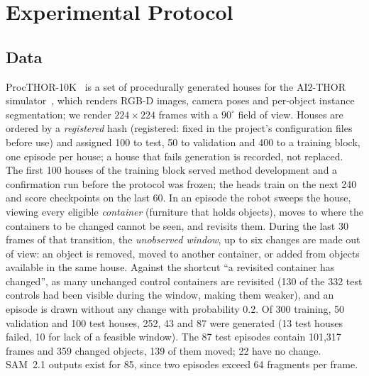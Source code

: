 \section{Experimental Protocol}
\label{sec:protocol}

\subsection{Data}
\label{sec:data}
ProcTHOR-10K~\cite{procthor2022} is a set of procedurally generated houses for the AI2-THOR simulator~\cite{ai2thor2017}, which renders RGB-D images, camera poses and per-object instance segmentation; we render $224\times224$ frames with a $90^\circ$ field of view.
Houses are ordered by a \emph{registered} hash (registered: fixed in the project's configuration files before use) and assigned 100 to test, 50 to validation and 400 to a training block, one episode per house; a house that fails generation is recorded, not replaced.
The first 100 houses of the training block served method development and a confirmation run before the protocol was frozen; the heads train on the next 240 and score checkpoints on the last 60.
In an episode the robot sweeps the house, viewing every eligible \emph{container} (furniture that holds objects), moves to where the containers to be changed cannot be seen, and revisits them.
During the last 30 frames of that transition, the \emph{unobserved window}, up to six changes are made out of view: an object is removed, moved to another container, or added from objects available in the same house.
Against the shortcut ``a revisited container has changed'', as many unchanged control containers are revisited (130 of the 332 test controls had been visible during the window, making them weaker), and an episode is drawn without any change with probability 0.2.
Of 300 training, 50 validation and 100 test houses, 252, 43 and 87 were generated (13 test houses failed, 10 for lack of a feasible window).
The 87 test episodes contain 101,317 frames and 359 changed objects, 139 of them moved; 22 have no change. SAM~2.1 outputs exist for 85, since two episodes exceed 64 fragments per frame.

